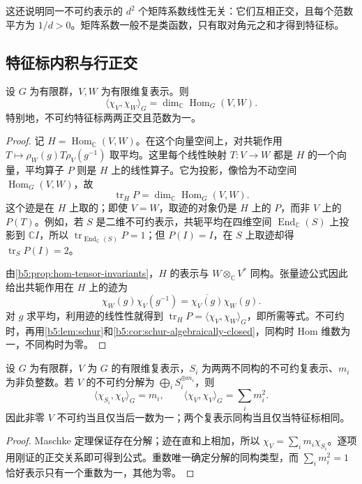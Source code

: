 这还说明同一不可约表示的 \(d^2\) 个矩阵系数线性无关：它们互相正交，且每个范数平方为 \(1/d>0\)。矩阵系数一般不是类函数，只有取对角元之和才得到特征标。

\subsection{特征标内积与行正交}
\label{b5:subsec:0202:02}

\begin{theorem}\label{b5:thm:character-hom-inner-product}
	设 \(G\) 为有限群，\(V,W\) 为有限维复表示。则
	\[
		\langle\chi_V,\chi_W\rangle_G =\dim_{\mathbb C}\operatorname{Hom}_G(V,W).
	\]
	特别地，不可约特征标两两正交且范数为一。
\end{theorem}
\begin{proof}
	记 \(H=\operatorname{Hom}_{\mathbb C}(V,W)\)。在这个向量空间上，对共轭作用 \(T\mapsto\rho_W(g)T\rho_V(g^{-1})\) 取平均。这里每个线性映射 \(T:V\to W\) 都是 \(H\) 的一个向量，平均算子 \(P\) 则是 \(H\) 上的线性算子。它为投影，像恰为不动空间 \(\operatorname{Hom}_G(V,W)\)，故
	\[
		\operatorname{tr}_{H}P=\dim_{\mathbb C}\operatorname{Hom}_G(V,W).
	\]
	这个迹是在 \(H\) 上取的；即使 \(V=W\)，取迹的对象仍是 \(H\) 上的 \(P\)，而非 \(V\) 上的 \(P(T)\)。例如，若 \(S\) 是二维不可约表示，共轭平均在四维空间 \(\operatorname{End}_{\mathbb C}(S)\) 上投影到 \(\mathbb C I\)，所以 \(\operatorname{tr}_{\operatorname{End}_{\mathbb C}(S)}P=1\)；但 \(P(I)=I\)，在 \(S\) 上取迹却得 \(\operatorname{tr}_{S}P(I)=2\)。

	由\cref{b5:prop:hom-tensor-invariants}，\(H\) 的表示与 \(W\otimes_{\mathbb C}V^*\) 同构。张量迹公式因此给出共轭作用在 \(H\) 上的迹为
	\[
		\chi_W(g)\chi_V(g^{-1})=\overline{\chi_V(g)}\chi_W(g).
	\]
	对 \(g\) 求平均，利用迹的线性性就得到 \(\operatorname{tr}_H P=\langle\chi_V,\chi_W\rangle_G\)，即所需等式。不可约时，再用\cref{b5:lem:schur}和\cref{b5:cor:schur-algebraically-closed}，同构时 Hom 维数为一，不同构时为零。
\end{proof}

\begin{corollary}\label{b5:cor:character-irreducibility}
	设 \(G\) 为有限群，\(V\) 为 \(G\) 的有限维复表示，\(S_i\) 为两两不同构的不可约复表示、\(m_i\) 为非负整数。若 \(V\) 的不可约分解为 \(\bigoplus_i S_i^{\oplus m_i}\)，则
	\[
		\langle\chi_{S_i},\chi_V\rangle_G=m_i,\qquad \langle\chi_V,\chi_V\rangle_G=\sum_i m_i^2.
	\]
	因此非零 \(V\) 不可约当且仅当后一数为一；两个复表示同构当且仅当特征标相同。
\end{corollary}
\begin{proof}
	Maschke 定理保证存在分解；迹在直和上相加，所以 \(\chi_V=\sum_i m_i\chi_{S_i}\)。逐项用刚证的正交关系即可得到公式。重数唯一确定分解的同构类型，而 \(\sum_i m_i^2=1\) 恰好表示只有一个重数为一，其他为零。
\end{proof}

